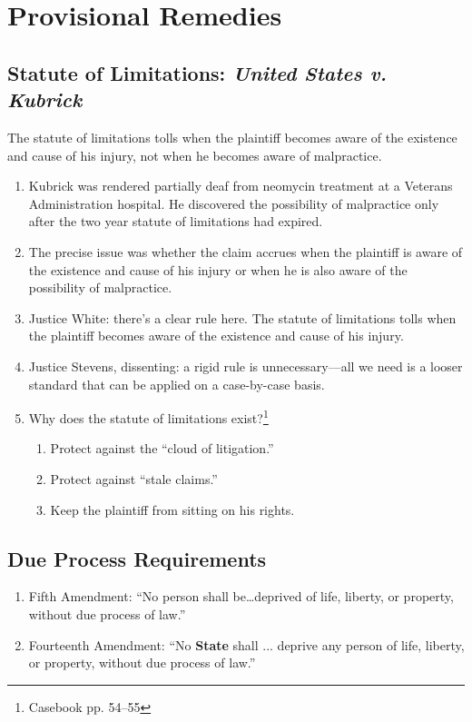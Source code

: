 \section{Provisional Remedies}

\subsection{Statute of Limitations: \emph{United States v. Kubrick}}

 The statute of limitations tolls when the plaintiff becomes aware of the 
 existence and cause of his injury, not when he becomes aware of malpractice.

\begin{enumerate}
    \item Kubrick was rendered partially deaf from neomycin treatment at a
    Veterans Administration hospital. He discovered the possibility of 
    malpractice only after the two year statute of limitations had expired.
    \item The precise issue was whether the claim accrues when the plaintiff 
    is aware of the existence and cause of his injury or when he is also aware 
    of the possibility of malpractice.
    \item Justice White: there's a clear rule here. The statute of limitations 
    tolls when the plaintiff becomes aware of the existence and cause of his 
    injury.
    \item Justice Stevens, dissenting: a rigid rule is unnecessary---all we 
    need is a looser standard that can be applied on a case-by-case basis.
    \item Why does the statute of limitations exist?\footnote{Casebook pp.  
    54--55}
    \begin{enumerate}
        \item Protect against the ``cloud of litigation.''
        \item Protect against ``stale claims.''
        \item Keep the plaintiff from sitting on his rights.
    \end{enumerate}
\end{enumerate}

\subsection{Due Process Requirements}

\begin{enumerate}
    \item Fifth Amendment: ``No person shall be\ldots deprived of life, 
    liberty, or property, without due process of law.''
    \item Fourteenth Amendment: ``No \textbf{State} shall ... deprive any 
    person of life, liberty, or property, without due process of law.''
\end{enumerate}


